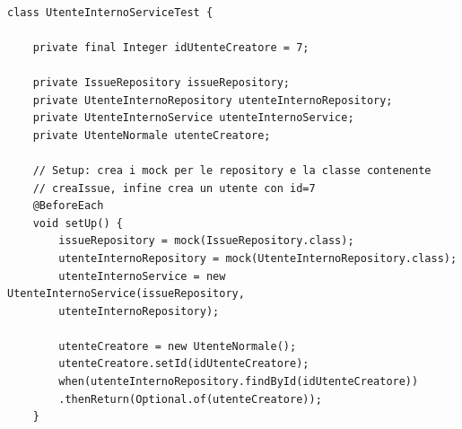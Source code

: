 \begin{listing}[!ht]
\begin{verbatim}

class UtenteInternoServiceTest {

    private final Integer idUtenteCreatore = 7;

    private IssueRepository issueRepository;
    private UtenteInternoRepository utenteInternoRepository;
    private UtenteInternoService utenteInternoService;
    private UtenteNormale utenteCreatore;

    // Setup: crea i mock per le repository e la classe contenente 
    // creaIssue, infine crea un utente con id=7
    @BeforeEach
    void setUp() {
        issueRepository = mock(IssueRepository.class);
        utenteInternoRepository = mock(UtenteInternoRepository.class);
        utenteInternoService = new UtenteInternoService(issueRepository, 
        utenteInternoRepository);

        utenteCreatore = new UtenteNormale();
        utenteCreatore.setId(idUtenteCreatore);
        when(utenteInternoRepository.findById(idUtenteCreatore))
        .thenReturn(Optional.of(utenteCreatore));
    }

\end{verbatim}
\end{listing}

\clearpage


